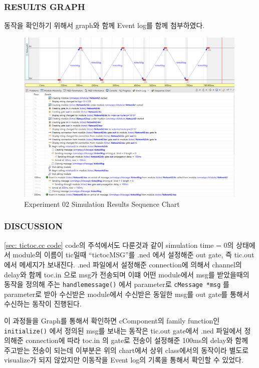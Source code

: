         \subsubsection{RESULTS GRAPH}
        동작을 확인하기 위해서 graph와 함께 Event log를 함께 첨부하였다. \\
            \vspace{-4mm}
            \begin{figure}[!h]\centering 
            	\includegraphics[width=0.99\textwidth]{image/week10/2-2.png}
            	\caption{\footnotesize
            	Experiment 02 Simulation Results Sequence Chart}
            	\vspace{-10pt}
            \end{figure}
            \vspace{-4mm}
        \subsubsection{DISCUSSION}
            \ref{sec: tictoc.cc code} code의 주석에서도 다룬것과 같이 simulation time = 0의 상태에서  module의 이름이 tic일때  “tictocMSG”를 .ned 에서 설정해준 out gate, 즉 tic.out에서 메세지가 보내진다. .ned 파일에서 설정해준 connection에 의해서 channel의 delay와 함께 toc.in 으로 msg가 전송되며 이떄 어떤 module에서 msg를 받았을때의 동작을 정의해 주는 \texttt{handlemessage()} 에서 parameter로  \texttt{cMessage *msg} 를 parameter로 받아 수신받은 module에서 수신받은 동일한 msg를 out gate를 통해서 수신하는 동작이 진행된다.
            
            이 과정들을 Graph를 통해서 확인하면 cComponent의 family function인 \texttt{initialize()} 에서 정의된  msg를 보내는 동작은 tic.out  gate에서 .ned 파일에서 정의해준  connection에 따라 toc.in 의 gate로 전송이 설정해준 100ms의 delay와 함께 주고받는 전송이 되는데 이부분은 위의 chart에서 상위 class에서의 동작이라 별도로 visualize가 되지 않았지만 이동작을 Event log의 기록을 통해서 확인할 수 있었다.
            
